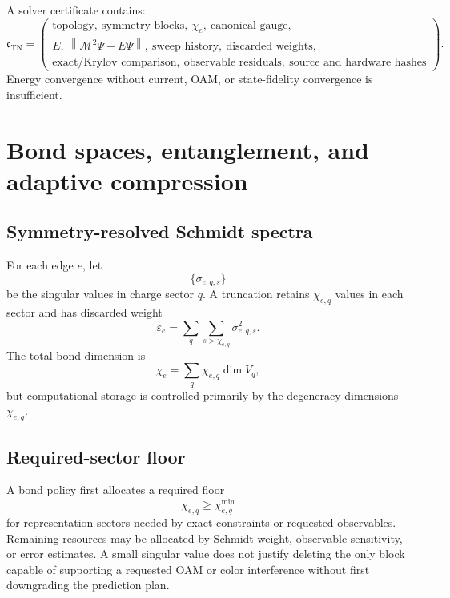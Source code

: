 \documentclass[11pt]{article}
\newcommand{\TN}{\ensuremath{\mathrm{TN}}}
\newcommand{\cM}{\mathcal M}
\newcommand{\eps}{\varepsilon}
\newcommand{\norm}[1]{\left\lVert#1\right\rVert}
\begin{document}
A solver certificate contains:
\begin{equation}
 \mathfrak c_{\TN}=
 \left(
 \begin{gathered}
 \text{topology},\ \text{symmetry blocks},\ \chi_e,\
 \text{canonical gauge},\\
 E,\ \norm{\cM^2\Psi-E\Psi},\
 \text{sweep history},\ \text{discarded weights},\\
 \text{exact/Krylov comparison},\
 \text{observable residuals},\
 \text{source and hardware hashes}
 \end{gathered}
 \right).
\label{eq:tn-solver-certificate}
\end{equation}
Energy convergence without current, OAM, or state-fidelity convergence is
insufficient.

\section{Bond spaces, entanglement, and adaptive compression}
\label{sec:bond-adaptation}

\subsection{Symmetry-resolved Schmidt spectra}

For each edge \(e\), let
\begin{equation}
 \{\sigma_{e,q,s}\}
\label{eq:symmetry-schmidt-values}
\end{equation}
be the singular values in charge sector \(q\).  A truncation retains
\(\chi_{e,q}\) values in each sector and has discarded weight
\begin{equation}
 \eps_e
 =
 \sum_q\sum_{s>\chi_{e,q}}
 \sigma_{e,q,s}^{2}.
\label{eq:discarded-weight}
\end{equation}
The total bond dimension is
\begin{equation}
 \chi_e=\sum_q \chi_{e,q}\dim V_q,
\label{eq:physical-bond-dimension}
\end{equation}
but computational storage is controlled primarily by the degeneracy
dimensions \(\chi_{e,q}\).

\subsection{Required-sector floor}

A bond policy first allocates a required floor
\begin{equation}
 \chi_{e,q}\geq \chi_{e,q}^{\min}
\label{eq:required-sector-floor}
\end{equation}
for representation sectors needed by exact constraints or requested
observables.  Remaining resources may be allocated by Schmidt weight,
observable sensitivity, or error estimates.  A small singular value does not
justify deleting the only block capable of supporting a requested OAM or color
interference without first downgrading the prediction plan.
\end{document}
